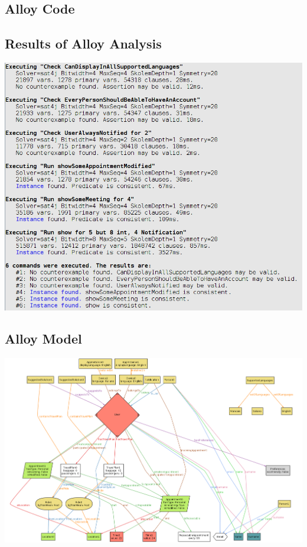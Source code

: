 \subsection{Alloy Code}
\subsection{Results of Alloy Analysis}
\includegraphics[scale=0.5]{Images/alloyRun}
\begin{landscape}
	\thispagestyle{empty}
	\subsection{Alloy Model}
	\centerline{\includegraphics[scale=0.45]{Images/ModelExample}}
\end{landscape}